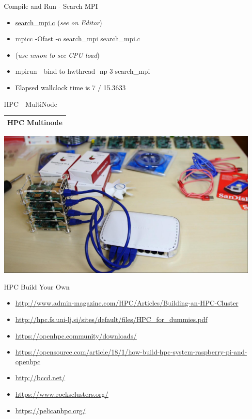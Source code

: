 \documentclass[ignorenonframetext,]{beamer}
\providecommand{\tightlist}{%
  \setlength{\itemsep}{0pt}\setlength{\parskip}{0pt}}
\begin{document}
\begin{frame}{Compile and Run - Search MPI}

\begin{itemize}
\tightlist
\item
  \url{search_mpi.c} (\emph{see on Editor})
\item
  mpicc -Ofast -o search\_mpi search\_mpi.c
\item
  (\emph{use nmon to see CPU load})
\item
  mpirun -\/-bind-to hwthread -np 3 search\_mpi
\end{itemize}


\begin{itemize}
\tightlist
\item
  Elapsed wallclock time is 7 / 15.3633
\end{itemize}


\end{frame}

\begin{frame}{HPC - MultiNode}

\begin{longtable}[]{@{}l@{}}
\toprule
\endhead
HPC Multinode\tabularnewline
\bottomrule
\end{longtable}

\includegraphics{images/PI-Cluster.jpg}

\end{frame}

\begin{frame}{HPC Build Your Own}

\begin{itemize}
\item
  \url{http://www.admin-magazine.com/HPC/Articles/Building-an-HPC-Cluster}
\item
  \url{http://hpc.fs.uni-lj.si/sites/default/files/HPC_for_dummies.pdf}
\item
  \url{https://openhpc.community/downloads/}
\item
  \url{https://opensource.com/article/18/1/how-build-hpc-system-raspberry-pi-and-openhpc}
\item
  \url{http://bccd.net/}
\item
  \url{https://www.rocksclusters.org/}
\item
  \url{https://pelicanhpc.org/}
\end{itemize}

\end{frame}
\end{document}

